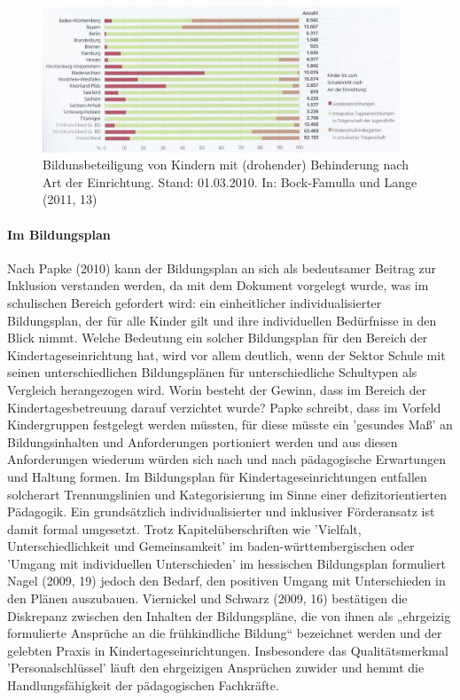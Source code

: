 \begin{figure}
  \centering
  \includegraphics[width=0.95\textwidth]{bilder/bildungsbeteiligung}
  \caption{Bildunsbeteiligung von Kindern mit (drohender) Behinderung nach Art der Einrichtung. Stand: 01.03.2010. In: Bock-Famulla und Lange (2011, 13)}
  \label{bild:bildungsbeteiligung}
\end{figure}

\paragraph{Im Bildungsplan}
Nach Papke (2010) kann der Bildungsplan an sich als bedeutsamer Beitrag zur Inklusion verstanden werden, da mit dem Dokument vorgelegt wurde, was im schulischen Bereich gefordert wird: ein einheitlicher individualisierter Bildungsplan, der für alle Kinder gilt und ihre individuellen Bedürfnisse in den Blick nimmt. Welche Bedeutung ein solcher Bildungsplan für den Bereich der Kindertageseinrichtung hat, wird vor allem deutlich, wenn der Sektor Schule mit seinen unterschiedlichen Bildungsplänen für unterschiedliche Schultypen als Vergleich herangezogen wird. Worin besteht der Gewinn, dass im Bereich der Kindertagesbetreuung darauf verzichtet wurde? Papke schreibt, dass im Vorfeld Kindergruppen festgelegt werden müssten, für diese müsste ein 'gesundes Maß' an Bildungsinhalten und Anforderungen portioniert werden und aus diesen Anforderungen wiederum würden sich nach und nach pädagogische Erwartungen und Haltung formen. Im Bildungsplan für Kindertageseinrichtungen entfallen solcherart Trennungslinien und Kategorisierung im Sinne einer defizitorientierten Pädagogik. Ein grundsätzlich individualisierter und inklusiver Förderansatz ist damit formal umgesetzt. Trotz Kapitelüberschriften wie 'Vielfalt, Unterschiedlichkeit und Gemeinsamkeit' im baden-württembergischen oder 'Umgang mit individuellen Unterschieden' im hessischen Bildungsplan formuliert Nagel (2009, 19) jedoch den Bedarf, den positiven Umgang mit Unterschieden in den Plänen auszubauen. Viernickel und Schwarz (2009, 16) bestätigen die Diskrepanz zwischen den Inhalten der Bildungspläne, die von ihnen als „ehrgeizig formulierte Ansprüche an die frühkindliche Bildung“ bezeichnet werden und der gelebten Praxis in Kindertageseinrichtungen. Insbesondere das Qualitätsmerkmal 'Personalschlüssel' läuft den ehrgeizigen Ansprüchen zuwider und hemmt die Handlungsfähigkeit der pädagogischen Fachkräfte.

